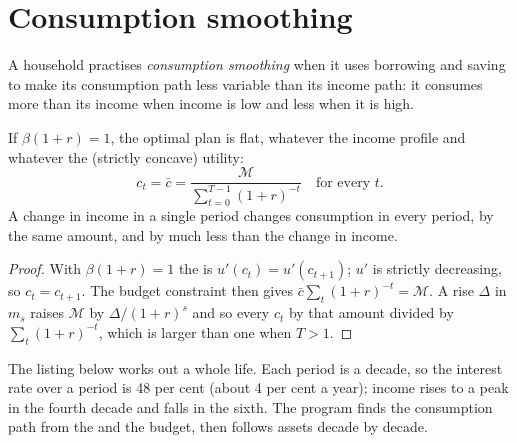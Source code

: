 \section{Consumption smoothing}\label{sec:b2:intertemporal-choice:smoothing}

\begin{definition}\label{def:b2:intertemporal-choice:smoothing}
A household practises \emph{consumption smoothing} when it uses borrowing
and saving to make its consumption path less variable than its income path: it consumes more than its
income when income is low and less when it is high.
\end{definition}

\begin{proposition}\label{prop:b2:intertemporal-choice:flat}
If $\beta(1 + r) = 1$, the optimal plan is flat, whatever the income profile and whatever the
(strictly concave) utility:
\[
c_t = \bar c = \frac{\mathcal{M}}{\sum_{t=0}^{T-1}(1 + r)^{-t}} \quad\text{for every } t.
\]
A change in income in a single period changes consumption in every period, by the same amount, and by
much less than the change in income.
\end{proposition}

\begin{proof}
With $\beta(1 + r) = 1$ the  is $u'(c_t) = u'(c_{t+1})$; $u'$ is strictly decreasing, so
$c_t = c_{t+1}$. The budget constraint then gives $\bar c\sum_t (1 + r)^{-t} = \mathcal{M}$. A rise
$\Delta$ in $m_s$ raises $\mathcal{M}$ by $\Delta/(1 + r)^{s}$ and so every $c_t$ by that amount
divided by $\sum_t (1 + r)^{-t}$, which is larger than one when $T > 1$.
\end{proof}

The listing below works out a whole life. Each period is a decade, so the interest rate over a period
is 48 per cent (about 4 per cent a year); income rises to a peak in the fourth decade and falls in the
sixth. The program finds the consumption path from the  and the budget, then follows
assets decade by decade.

\label{lst:b2:intertemporal-choice:life-plan}

